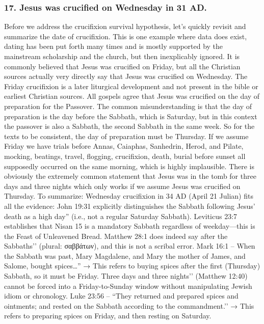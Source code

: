 \subsubsection{17.
Jesus was crucified on Wednesday in 31 AD.}\label{subsubsec:jesus-was-crucified-on-wednesday-in-31-ad.}
Before we address the crucifixion survival hypothesis, let's quickly revisit and summarize the date of crucifixion.
This is one example where data does exist, dating has been put forth many times and is mostly supported by the mainstream scholarship and the church, but then inexplicably ignored.
It is commonly believed that Jesus was crucified on Friday, but all the Christian sources actually very directly say that Jesus was crucified on Wednesday.
The Friday crucifixion is a later liturgical development and not present in the bible or earliest Christian sources.
All gospels agree that Jesus was crucified on the day of preparation for the Passover.
The common misunderstanding is that the day of preparation is the day before the Sabbath, which is Saturday, but in this context the passover is also a Sabbath, the second Sabbath in the same week.
So for the texts to be consistent, the day of preparation must be Thursday.
If we assume Friday we have trials before Annas, Caiaphas, Sanhedrin, Herod, and Pilate, mocking, beatings, travel, flogging, crucifixion, death, burial before sunset all supposedly occurred on the same morning, which is highly implausible.
There is obviously the extremely common statement that Jesus was in the tomb for three days and three nights which only works if we assume Jesus was crucified on Thursday.
To summarize: Wednesday crucifixion in 34 AD (April 21 Julian) fits all the evidence: John 19:31 explicitly distinguishes the Sabbath following Jesus’ death as a high day'' (i.e., not a regular Saturday Sabbath).
Leviticus 23:7 establishes that Nisan 15 is a mandatory Sabbath regardless of weekday---this is the Feast of Unleavened Bread.
Matthew 28:1 does indeed say after the Sabbaths’’ (plural: σαββάτων), and this is not a scribal error.
Mark 16:1 – When the Sabbath was past, Mary Magdalene, and Mary the mother of James, and Salome, bought spices\ldots'' → This refers to buying spices after the first (Thursday) Sabbath, so it must be Friday.
Three days and three nights’’ (Matthew 12:40) cannot be forced into a Friday-to-Sunday window without manipulating Jewish idiom or chronology.
Luke 23:56 – ``They returned and prepared spices and ointments; and rested on the Sabbath according to the commandment.’’ → This refers to preparing spices on Friday, and then resting on Saturday.
